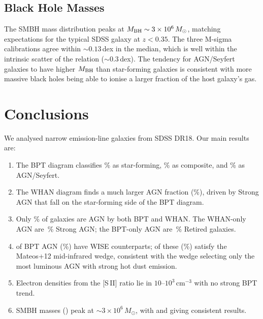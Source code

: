 \documentclass[a4paper,12pt]{article}
\begin{document}
\subsection{Black Hole Masses}

The SMBH mass distribution peaks at $M_{\rm BH} \sim 3 \times
10^6\,M_\odot$, matching expectations for the typical SDSS galaxy at
$z < 0.35$.  The three M-sigma calibrations agree within $\sim 0.13$\,dex
in the median, which is well within the intrinsic scatter of the
relation ($\sim 0.3$\,dex).  The tendency for AGN/Seyfert galaxies to
have higher $M_{\rm BH}$ than star-forming galaxies is consistent with
more massive black holes being able to ionise a larger fraction of the
host galaxy's gas.

\section{Conclusions}
\label{sec:conclusions}

We analysed \samplesize{} narrow emission-line galaxies from SDSS DR18.  Our
main results are:

\begin{enumerate}
  \item The BPT diagram classifies \bptSfPct{}\% as star-forming,
        \bptCompPct{}\% as composite, and \bptAgnPct{}\% as AGN/Seyfert.
  \item The WHAN diagram finds a much larger AGN fraction
        (\whanAgnTotPct{}\%), driven by Strong AGN that fall on the
        star-forming side of the BPT diagram.
  \item Only \bothAgnPct{}\% of galaxies are AGN by both BPT and WHAN.
        The \whanOnlyCount{} WHAN-only AGN are \woStrongPct{}\,\% Strong AGN; the \bptOnlyCount{}
        BPT-only AGN are \boRetPct{}\,\% Retired galaxies.
  \item \wiseMatched{} of \wiseAgnSample{} BPT AGN (\wiseMatchRate{}\%) have WISE counterparts;
        \wiseWedge{} of these (\wiseWedgePct{}\%) satisfy the Mateos+12 mid-infrared
        wedge, consistent with the wedge selecting only the most
        luminous AGN with strong hot dust emission.
  \item Electron densities from the [S\,II] ratio lie in
        $10$--$10^3$\,cm$^{-3}$ with no strong BPT trend.
  \item SMBH masses (\citet{tremaine2002}) peak at $\sim 3 \times 10^6\,M_\odot$,
        with \citet{gebhardt2000} and \citet{wu2009} giving consistent results.
\end{enumerate}
\end{document}
